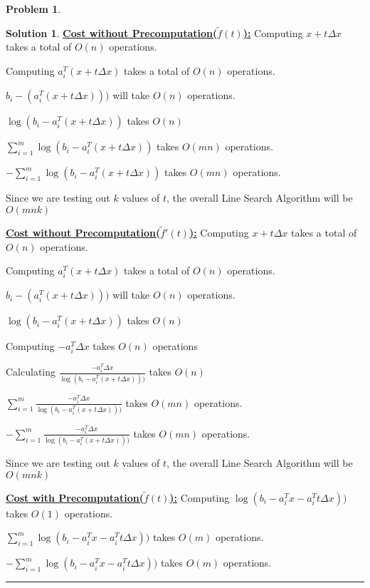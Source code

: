 \documentclass{article}
\theoremstyle{definition}
\newtheorem{problem}{Problem}
\def\fline{\rule{0.75\linewidth}{0.5pt}}
\newcommand{\finishline}{\begin{center}\fline\end{center}}
\newtheorem*{solution*}{Solution}
\newenvironment{solution}{\begin{solution*}}{{\finishline} \end{solution*}}
\begin{document}
\begin{problem}
\begin{enumerate}
\begin{solution}
\textbf{\underline{Cost without Precomputation($\tilde{f}(t)$):}} \newline 
Computing $x + t \Delta x$ takes a total of $O(n)$ operations. 

Computing $a_i^T(x + t \Delta x)$ takes a total of $O(n)$ operations. 

$b_i - (a_i^T(x + t \Delta x)))$ will take $O(n)$ operations. 

$\log{(b_i - a_i^T(x + t \Delta x))}$ takes $O(n)$  

$\sum_{i=1}^{m} \log{(b_i - a_i^T(x + t \Delta x))}$ takes $O(mn)$ operations. 

$- \sum_{i=1}^{m} \log{(b_i - a_i^T(x + t \Delta x))}$ takes $O(mn)$ operations. 


Since we are testing out $k$ values of $t$, the overall Line Search Algorithm will be $O(mnk)$ \newline 

\textbf{\underline{Cost without Precomputation($\tilde{f}'(t)$):}} \newline 
Computing $x + t \Delta x$ takes a total of $O(n)$ operations. 

Computing $a_i^T(x + t \Delta x)$ takes a total of $O(n)$ operations. 

$b_i - (a_i^T(x + t \Delta x)))$ will take $O(n)$ operations. 

$\log{(b_i - a_i^T(x + t \Delta x))}$ takes $O(n)$  

Computing $- a_i^T \Delta x$ takes $O(n)$ operations

Calculating $\frac{- a_i^T \Delta x}{\log{(b_i - a_i^T(x + t \Delta x)))}}$ takes $O(n)$

$\sum_{i=1}^{m} \frac{- a_i^T \Delta x}{\log{(b_i - a_i^T(x + t \Delta x)))}}$ takes $O(mn)$ operations. 

$- \sum_{i=1}^{m} \frac{- a_i^T \Delta x}{\log{(b_i - a_i^T(x + t \Delta x)))}}$ takes $O(mn)$ operations. 

Since we are testing out $k$ values of $t$, the overall Line Search Algorithm will be $O(mnk)$  \newline 


\textbf{\underline{Cost with Precomputation($\tilde{f}(t)$):}} \newline 
Computing $\log{(b_i - a_i^Tx - a_i^T t \Delta x))}$ takes $O(1)$ operations. 

$\sum_{i=1}^{m} \log{(b_i - a_i^Tx - a_i^T t \Delta x))}$ takes $O(m)$ operations. 

$- \sum_{i=1}^{m} \log{(b_i - a_i^Tx - a_i^T t \Delta x))}$ takes $O(m)$ operations. 



\end{solution}
\end{enumerate}
\end{problem}
\end{document}
